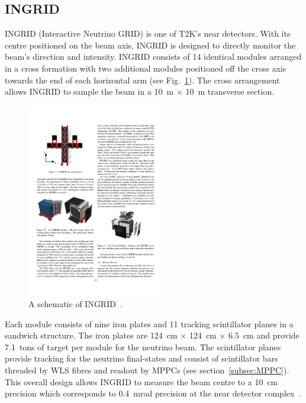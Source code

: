 \subsection{INGRID}
\label{subsec:INGRID}
INGRID (Interactive Neutrino GRID) is one of T2K's near detectors.  With its centre positioned on the beam axis, INGRID is designed to directly monitor the beam's direction and intensity.  INGRID consists of 14 identical modules arranged in a cross formation with two additional modules positioned off the cross axis towards the end of each horizontal arm (see Fig.~\ref{fig:INGRIDSchematic}).  The cross arrangement allows INGRID to sample the beam in a 10~m $\times$ 10~m transverse section.
\begin{figure}
  \centering
  \includegraphics[width=6cm]{images/t2k/INGRID.pdf}
  \caption{A schematic of INGRID~\cite{Abe2011106}.}
  \label{fig:INGRIDSchematic}
\end{figure}
\newline
\newline
Each module consists of nine iron plates and 11 tracking scintillator planes in a sandwich structure.  The iron plates are 124~cm $\times$ 124~cm $\times$ 6.5~cm and provide 7.1~tons of target per module for the neutrino beam.  The scintillator planes provide tracking for the neutrino final-states and consist of scintillator bars threaded by WLS fibres and readout by MPPCs (see section~\ref{subsec:MPPC}).
\newline
\newline
This overall design allows INGRID to measure the beam centre to a 10~cm precision which corresponds to 0.4~mrad precision at the near detector complex~\cite{Abe2011106}.


